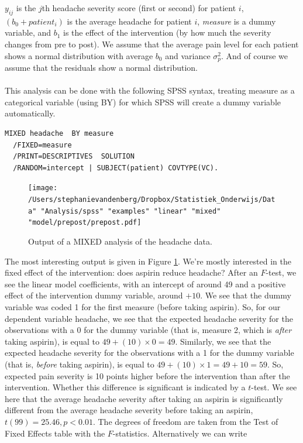 \documentclass[]{book}\usepackage[]{graphicx}\usepackage[]{color}
\begin{document}
$y_{ij}$ is the $j$th headache severity score (first or second) for patient $i$, $(b_0 + patient_i)$ is the average headache for patient $i$, \textit{measure} is a dummy variable, and $b_1$ is the effect of the intervention (by how much the severity changes from pre to post). We assume that the average pain level for each patient shows a normal distribution with average $b_0$ and variance $\sigma^2_p$. And of course we assume that the residuals show a normal distribution.
\\
\\
This analysis can be done with the following SPSS syntax, treating measure as a categorical variable (using BY) for which SPSS will create a dummy variable automatically. 


\begin{verbatim}
MIXED headache  BY measure
  /FIXED=measure
  /PRINT=DESCRIPTIVES  SOLUTION
  /RANDOM=intercept | SUBJECT(patient) COVTYPE(VC).
\end{verbatim}


\begin{figure}[h]
    \begin{center}
       \texttt{[image: /Users/stephanievandenberg/Dropbox/Statistiek\_Onderwijs/Data" "Analysis/spss" "examples" "linear" "mixed" "model/prepost/prepost.pdf]}
    \end{center}
    \label{fig:prepost}
    \caption{Output of a MIXED analysis of the headache data.}
\end{figure}

The most interesting output is given in Figure \ref{fig:prepost}. We're mostly interested in the fixed effect of the intervention: does aspirin reduce headache? After an $F$-test, we see the linear model coefficients, with an intercept of around 49 and a positive effect of the intervention dummy variable, around $+10$. We see that the dummy variable was coded 1 for the first measure (before taking aspirin). So, for our dependent variable headache, we see that the expected headache severity for the observations with a 0 for the dummy variable (that is, measure 2, which is \textit{after} taking aspirin), is equal to $49 + (10) \times 0 = 49$. Similarly, we see that the expected headache severity for the observations with a 1 for the dummy variable (that is, \textit{before} taking aspirin), is equal to $49 + (10) \times 1 = 49 + 10 = 59$. So, expected pain severity is 10 points higher before the intervention than after the intervention. Whether this difference is significant is indicated by a $t$-test. We see here that the average headache severity after taking an aspirin is significantly different from the average headache severity before taking an aspirin, $t(99) = 25.46, p < 0.01$. The degrees of freedom are taken from the Test of Fixed Effects table with the $F$-statistics. Alternatively we can write 
\end{document}
